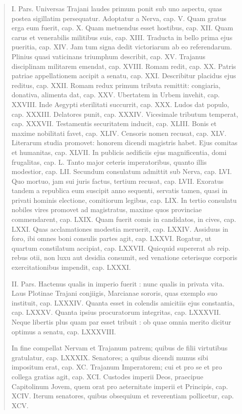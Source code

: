 \begin{quotation}
{I. Pars. Universas Trajani laudes primum ponit sub uno aspectu, quas postea sigillatim persequatur. Adoptatur a Nerva, cap. V. Quam gratus erga eum fuerit, cap. X. Quam metuendus esset hostibus, cap. XII. Quam carus et venerabilis militibus suis, cap. XIII. Traducta in bello prima ejus pueritia, cap. XIV. Jam tum signa dedit victoriarum ab eo referendarum. Plinius quasi vaticinans triumphum describit, cap. XV. Trajanus disciplinam militarem emendat, cap. XVIII. Romam redit, cap. XX. Patris patriae appellationem accipit a senatu, cap. XXI. Describitur placidus ejus reditus, cap. XXII. Romam redux primum tributa remittit: congiaria, donativa, alimenta dat, cap. XXV. Ubertatem in Urbem invehit, cap. XXVIII. Inde Aegypti sterilitati succurrit, cap. XXX. Ludos dat populo, cap. XXXIII. Delatores punit, cap. XXXIV. Vicesimale tributum temperat, cap. XXXVII. Testamentis securitatem inducit, cap. XLIII. Bonis et maxime nobilitati favet, cap. XLIV. Censoris nomen recusat, cap. XLV. Literarum studia promovet: honorem dicendi magistris habet. Ejus comitas et humanitas, cap. XLVII. In publicis aedificiis ejus magnificentia, domi frugalitas, cap. L. Tanto major ceteris imperatoribus, quanto illis modestior, cap. LII. Secundum consulatum admittit sub Nerva, cap. LVI. Quo mortuo, jam sui juris factus, tertium recusat, cap. LVII. Exoratus tandem a republica eum suscipit anno sequenti, servatis tamen, quasi in privati hominis electione, comitiorum legibus, cap. LIX. In tertio consulatu nobiles vires promovet ad magistratus, maxime quos provinciae commendarent, cap. LXIX. Quam fuerit comis in candidatos, in cives, cap. LXXI. Quas acclamationes modestia meruerit, cap. LXXIV. Assiduus in foro, ibi omnes boni consulis partes agit, cap. LXXVI. Rogatur, ut quartum constilatum accipiat, cap. LXXVII. Quicquid supererat ab reip. rebus otii, non luxu aut desidia consumit, sed venatione ceterisque corporis exercitationibus impendit, cap. LXXXI. 

II. Pars. Hactenus qualis in imperio fuerit : nunc qualis in privata vita. Laus Plotinae Trajani conjiigis, Marcianae sororis, quas exemplo suo instituit, cap. LXXXIV. Quanta esset in colendis amicitiis ejus constantia, cap. LXXXV. Quanta ipsius procuratorum integritas, cap. LXXXVII. Neque libertis plus quam par esset tribuit : ob quae omnia merito dicitur optimus a senatu, cap. LXXXVIII.

In fine compellat Nervam et Trajanum patrem; quibus de filii virtutibus gratulatur, cap. LXXXIX. Senatores; a quibus dicendi munus sibi impositum erat, cap. XC. Trajanum Imperatorem; cui et pro se et pro collega gratias agit, cap. XCI. Custodes imperii Deos, praecipue Capitolinum Jovem, quem orat pro aeternitate imperii et Principis, cap. XCIV. Iterum senatores, quibus obsequium et reverentiam pollicetur, cap. XCV. 
}
\end{quotation}



